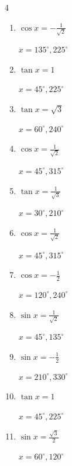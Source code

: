 \begin{multicols}{4}
\begin{enumerate}
        $\displaystyle x = 45^{\circ} , 135^{\circ}$

  \item $\displaystyle \cos{x}  = -\frac{1}{\sqrt{2}}$

        $\displaystyle x = 135^{\circ} , 225^{\circ}$

  \item $\displaystyle \tan{x}  = 1$

        $\displaystyle x = 45^{\circ} , 225^{\circ}$

  \item $\displaystyle \tan{x}  = \sqrt{3}$

        $\displaystyle x = 60^{\circ} , 240^{\circ}$

  \item $\displaystyle \cos{x}  = \frac{1}{\sqrt{2}}$

        $\displaystyle x = 45^{\circ} , 315^{\circ}$

  \item $\displaystyle \tan{x}  = \frac{1}{\sqrt{3}}$

        $\displaystyle x = 30^{\circ} , 210^{\circ}$

  \item $\displaystyle \cos{x}  = \frac{1}{\sqrt{2}}$

        $\displaystyle x = 45^{\circ} , 315^{\circ}$

  \item $\displaystyle \cos{x}  = -\frac{1}{2}$

        $\displaystyle x = 120^{\circ} , 240^{\circ}$

  \item $\displaystyle \sin{x}  = \frac{1}{\sqrt{2}}$

        $\displaystyle x = 45^{\circ} , 135^{\circ}$

  \item $\displaystyle \sin{x}  = -\frac{1}{2}$

        $\displaystyle x = 210^{\circ} , 330^{\circ}$

\columnbreak %

  \item $\displaystyle \tan{x}  = 1$

        $\displaystyle x = 45^{\circ} , 225^{\circ}$

  \item $\displaystyle \sin{x}  = \frac{\sqrt{3}}{2}$

        $\displaystyle x = 60^{\circ} , 120^{\circ}$


\end{enumerate}
\end{multicols}
